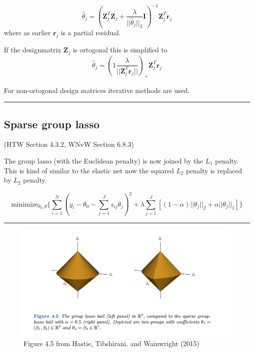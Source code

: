 \documentclass[
  letterpaper,
  DIV=11,
  numbers=noendperiod]{scrartcl}
\begin{document}
\[\hat{\theta}_j=({\boldsymbol Z}_j^T{\boldsymbol Z}_j+
\frac{\lambda}{\lvert\lvert \hat{\theta}_j{\rvert \rvert}_2}{\boldsymbol I})^{-1}{\boldsymbol Z}_j^T{\boldsymbol r}_j\]
where as earlier \({\boldsymbol r}_j\) is a partial residual.

If the designmatrix \({\boldsymbol Z}_j\) is ortogonal this is
simplified to \[\hat{\theta}_j=(1
\frac{\lambda}{\lvert \lvert {\boldsymbol Z}_j^T{\boldsymbol r}_j \rvert \rvert})_{+}{\boldsymbol Z}_j^T{\boldsymbol r}_j\]

For non-ortogonal design matrices iterative methods are used.

\begin{center}\rule{0.5\linewidth}{0.5pt}\end{center}

\hypertarget{sparse-group-lasso}{%
\subsection{Sparse group lasso}\label{sparse-group-lasso}}

(HTW Section 4.3.2, WNvW Section 6.8.3)

The group lasso (with the Euclidean penalty) is now joined by the
\(L_1\) penalty. This is kind of similar to the elastic net now the
squared \(L_2\) penalty is replaced by \(L_2\) penalty.

\[\text{minimize}_{\theta_0,\theta} \{ \sum_{i=1}^N (y_i-\theta_0-\sum_{j=1}^J z_{ij}\theta_j )^2 + \lambda \sum_{j=1}^J [(1-\alpha) \lvert \lvert \theta_j {\rvert \rvert}_2 + \alpha \lvert\lvert \theta_j{\rvert \rvert}_1]\}\]

\begin{center}\rule{0.5\linewidth}{0.5pt}\end{center}

\begin{figure}

{\centering \includegraphics[width=1\textwidth,height=\textheight]{./HTWFig45.png}

}

\caption{Figure 4.5 from Hastie, Tibshirani, and Wainwright (2015)}

\end{figure}
\end{document}
